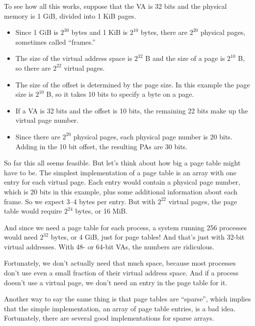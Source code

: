 \documentclass[12pt]{book}
\begin{document}
To see how all this works, suppose that the VA is 32 bits and the physical memory is 1 GiB, divided into 1 KiB pages.

\begin{itemize}

\item Since 1 GiB is $2^{30}$ bytes and 1 KiB is $2^{10}$ bytes, there
  are $2^{20}$ physical pages, sometimes called ``frames.''

\item The size of the virtual address space is $2^{32}$ B and the size
  of a page is $2^{10}$ B, so there are $2^{22}$ virtual pages.

\item The size of the offset is determined by the page size.  In this
  example the page size is $2^{10}$ B, so it takes 10 bits to specify
  a byte on a page.

\item If a VA is 32 bits and the offset is 10 bits, the remaining
  22 bits make up the virtual page number.

\item Since there are $2^{20}$ physical pages, each physical page
  number is 20 bits.  Adding in the 10 bit offset, the resulting
  PAs are 30 bits.

\end{itemize}

So far this all seems feasible.  But let's think about how big a page
table might have to be.  The simplest implementation of a page
table is an array with one entry for each virtual page.
Each entry would contain a physical page number, which is 20 bits
in this example, plus some additional information about each
frame.  So we expect 3--4 bytes per entry.  But with $2^{22}$ virtual pages,
the page table would require $2^{24}$ bytes, or 16 MiB.

And since we need a page table for each process, a system running
256 processes would need $2^{32}$ bytes, or 4 GiB, just for page tables!
And that's just with 32-bit virtual addresses.  With 48- or 64-bit
VAs, the numbers are ridiculous.

Fortunately, we don't actually need that much space, because
most processes don't use even a small fraction of their
virtual address space.  And if a process doesn't use a virtual
page, we don't need an entry in the page table for it.

Another way to say the same thing is that page tables are ``sparse'',
which implies that the simple implementation, an array of page
table entries, is a bad idea.  Fortunately, there are several
good implementations for sparse arrays.
\end{document}
